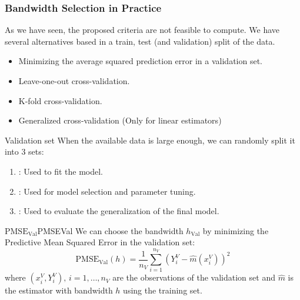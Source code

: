 \subsubsection{Bandwidth Selection in Practice}
As we have seen, the proposed criteria are not feasible to compute. We have several
alternatives based in a train, test (and validation) split of the data.
\begin{itemize}
	\item Minimizing the average squared prediction error in a validation set.
	\item Leave-one-out cross-validation.
	\item K-fold cross-validation.
	\item Generalized cross-validation (Only for linear estimators)
\end{itemize}

\begin{definition}{Validation set}{}
	When the available data is large enough, we can randomly split it into
	3 sets:
	\begin{enumerate}
		\item {}: Used to fit the model.
		\item {}: Used for model selection and parameter tuning.
		\item {}: Used to evaluate the generalization of the final model.
	\end{enumerate}
\end{definition}

\begin{definition}{$\text{PMSE}_\text{Val}$}{PMSEVal}
	We can choose the bandwidth $h_\text{Val}$ by minimizing the
	Predictive Mean Squared Error in the validation set:
	\begin{equation*}
		\text{PMSE}_\text{Val}(h) = \frac{1}{n_V} \sum_{i=1}^{n_V} \left( Y_i^V - \hat m(x_i^V) \right)^2
	\end{equation*}
	where $(x_i^V, Y_i^V),\,i=1,\ldots,n_V$ are the observations of the validation set and
	$\hat m$ is the estimator with bandwidth $h$ using the training set.
\end{definition}

